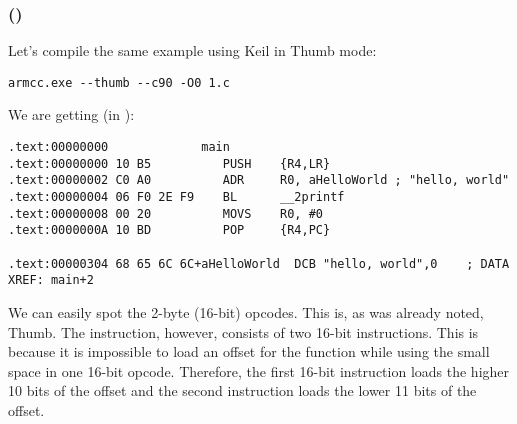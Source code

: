 \subsubsection{\NonOptimizingKeilVI (\ThumbMode)}

Let's compile the same example using Keil in Thumb mode:

\begin{lstlisting}
armcc.exe --thumb --c90 -O0 1.c 
\end{lstlisting}

We are getting (in \IDA):

\begin{lstlisting}[caption=\NonOptimizingKeilVI (\ThumbMode) + \IDA,style=customasm]
.text:00000000             main
.text:00000000 10 B5          PUSH    {R4,LR}
.text:00000002 C0 A0          ADR     R0, aHelloWorld ; "hello, world"
.text:00000004 06 F0 2E F9    BL      __2printf
.text:00000008 00 20          MOVS    R0, #0
.text:0000000A 10 BD          POP     {R4,PC}

.text:00000304 68 65 6C 6C+aHelloWorld  DCB "hello, world",0    ; DATA XREF: main+2
\end{lstlisting}

We can easily spot the 2-byte (16-bit) opcodes. This is, as was already noted, Thumb.
The  instruction, however, consists of two 16-bit instructions.
This is because it is impossible to load an offset for the \printf function while using the small space in one 16-bit opcode.
Therefore, the first 16-bit instruction loads the higher 10 bits of the offset and the second instruction loads 
the lower 11 bits of the offset.


